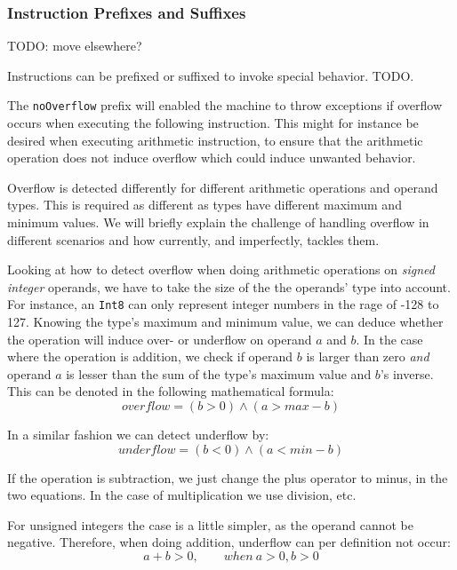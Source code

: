 
\subsubsection{Instruction Prefixes and Suffixes}

TODO: move elsewhere?

Instructions can be prefixed or suffixed to invoke special behavior. TODO.

The {\tt noOverflow} prefix will enabled the machine to throw exceptions if
overflow occurs when executing the following instruction. This might for
instance be desired when executing arithmetic instruction, to ensure that the
arithmetic operation does not induce overflow which could induce unwanted
behavior.

Overflow is detected differently for different arithmetic operations and operand
types. This is required as different as types have different maximum and minimum
values. We will briefly explain the challenge of handling overflow in different
scenarios and how \thename{} currently, and imperfectly, tackles them.

Looking at how to detect overflow when doing arithmetic operations on {\em
  signed integer} operands, we have to take the size of the the operands' type
into account. For instance, an {\tt Int8} can only represent integer numbers in
the rage of -128 to 127. Knowing the type's maximum and minimum value, we can
deduce whether the operation will induce over- or underflow on operand $a$ and
$b$. In the case where the operation is addition, we check if operand $b$ is
larger than zero {\em and} operand $a$ is lesser than the sum of the type's
maximum value and $b$'s inverse. This can be denoted in the following
mathematical formula:
\label{eq:overflow}
\begin{equation}
  overflow = (b > 0) \wedge (a > max - b)
\end{equation}

In a similar fashion we can detect underflow by:
\begin{equation}
  underflow = (b < 0) \wedge (a < min - b)
\end{equation}

If the operation is subtraction, we just change the plus operator to minus, in
the two equations. In the case of multiplication we use division, etc.

For unsigned integers the case is a little simpler, as the operand cannot be
negative. Therefore, when doing addition, underflow can per definition not
occur:
\begin{equation}
  a + b > 0, \qquad when\ a > 0, b > 0
\end{equation}

